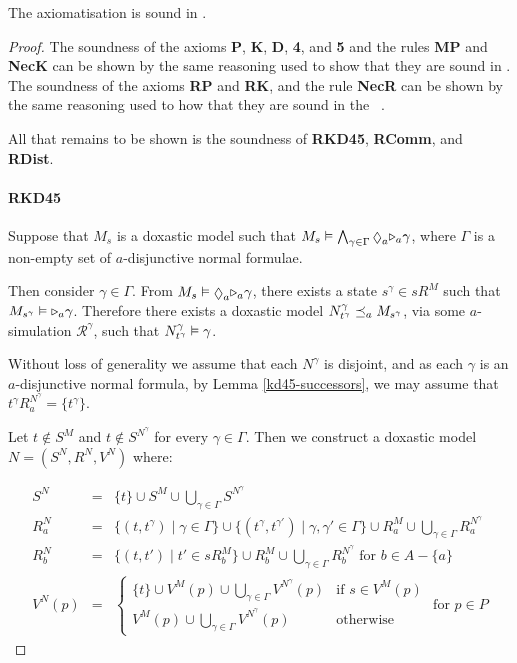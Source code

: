 \begin{lemma}\label{kd45-sound}
The axiomatisation \axiomKDF{} is sound in \logicKDF{}.
\end{lemma}

\begin{proof}
The soundness of the axioms {\bf P}, {\bf K}, {\bf D}, {\bf 4}, and {\bf 5} and the
rules {\bf MP} and {\bf NecK} can be shown by the same reasoning used to show
that they are sound in \logicKD{}. The soundness of the axioms {\bf RP} and {\bf
RK}, and the rule {\bf NecR} can be shown by the same reasoning used to how
that they are sound in the \logicKiF{}~\cite{french2010future}.

All that remains to be shown is the soundness of {\bf RKD45}, {\bf RComm}, and
{\bf RDist}.

\paragraph{RKD45}
Suppose that $M_s$ is a doxastic model such that $M_s \entails \bigwedge_{\gamma
\in \Gamma} \suspects_a \somerefs_a \gamma$, where $\Gamma$ is a non-empty set of
$a$-disjunctive normal formulae.

Then consider $\gamma \in \Gamma$. From $M_s \entails \suspects_a \somerefs_a
\gamma$, there exists a state $s^\gamma \in sR^M$ such that $M_{s^\gamma}
\vDash {\ensuremath{\mathopen{\triangleright}}}_a \gamma$. Therefore there exists a doxastic model
$N^\gamma_{t^\gamma} \preceq_a M_{s^\gamma}$, via some $a$-simulation
$\mathcal{R}^\gamma$, such that $N^\gamma_{t^\gamma} \vDash \gamma$.

Without loss of generality we assume that each $N^\gamma$ is disjoint, and as
each $\gamma$ is an $a$-disjunctive normal formula, by Lemma
\ref{kd45-successors}, we may assume that $t^\gamma R^{N^\gamma}_a =
\{t^\gamma\}$.

Let $t \notin S^M$ and $t \notin S^{N^\gamma}$ for every $\gamma \in \Gamma$.
Then we construct a doxastic model $N = (S^N, R^N, V^N)$ where:

\begin{eqnarray*}
S^N &=& \{t\} \cup S^M \cup \bigcup_{\gamma \in \Gamma} S^{N^\gamma}\\
R^N_a &=& \{(t, t^\gamma) \mid \gamma \in \Gamma\} 
\cup \{(t^\gamma, t^{\gamma'}) \mid \gamma, \gamma' \in \Gamma\} 
\cup R^M_a
\cup \bigcup_{\gamma \in \Gamma} R^{N^\gamma}_a\\
R^N_b &=& \{(t, t') \mid t' \in sR^M_b\}
\cup R^M_b
\cup \bigcup_{\gamma \in \Gamma} R^{N^\gamma}_b \text{ for $b \in A - \{a\}$}\\
V^N(p) &=& 
\begin{cases}
\{t\} \cup V^M(p) \cup \bigcup_{\gamma \in \Gamma} V^{N^\gamma}(p) & \text{if $s
\in V^M(p)$}\\
V^M(p) \cup \bigcup_{\gamma \in \Gamma} V^{N^\gamma}(p) & \text{otherwise}
\end{cases}
\text{ for $p \in P$}
\end{eqnarray*}


\end{proof}
